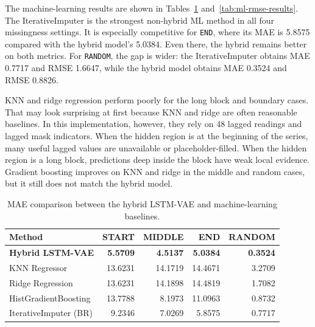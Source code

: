 The machine-learning results are shown in Tables~\ref{tab:ml-mae-results} and~\ref{tab:ml-rmse-results}. The IterativeImputer is the strongest non-hybrid ML method in all four missingness settings. It is especially competitive for \texttt{END}, where its MAE is 5.8575 compared with the hybrid model's 5.0384. Even there, the hybrid remains better on both metrics. For \texttt{RANDOM}, the gap is wider: the IterativeImputer obtains MAE 0.7717 and RMSE 1.6647, while the hybrid model obtains MAE 0.3524 and RMSE 0.8826.

KNN and ridge regression perform poorly for the long block and boundary cases. That may look surprising at first because KNN and ridge are often reasonable baselines. In this implementation, however, they rely on 48 lagged readings and lagged mask indicators. When the hidden region is at the beginning of the series, many useful lagged values are unavailable or placeholder-filled. When the hidden region is a long block, predictions deep inside the block have weak local evidence. Gradient boosting improves on KNN and ridge in the middle and random cases, but it still does not match the hybrid model.

\begin{table}[ht]
	\centering
	\small
	\begin{tabular}{lrrrr}
		\toprule
		\textbf{Method} & \textbf{START} & \textbf{MIDDLE} & \textbf{END} & \textbf{RANDOM} \\
		\midrule
		\textbf{Hybrid LSTM-VAE} & \textbf{5.5709} & \textbf{4.5137} & \textbf{5.0384} & \textbf{0.3524} \\
		KNN Regressor & 13.6231 & 14.1719 & 14.4671 & 3.2709 \\
		Ridge Regression & 13.6231 & 14.1898 & 14.4819 & 1.7082 \\
		HistGradientBoosting & 13.7788 & 8.1973 & 11.0963 & 0.8732 \\
		IterativeImputer (BR) & 9.2346 & 7.0269 & 5.8575 & 0.7717 \\
		\bottomrule
	\end{tabular}
	\caption{MAE comparison between the hybrid LSTM-VAE and machine-learning baselines.}
	\label{tab:ml-mae-results}
\end{table}

